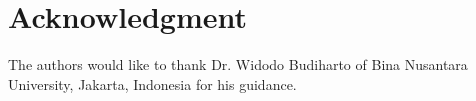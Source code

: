 \documentclass[conference]{IEEEtran}
\begin{document}


%


%
%
%



\section*{Acknowledgment}

The authors would like to thank Dr. Widodo Budiharto of Bina Nusantara University, Jakarta, Indonesia for his guidance.
\end{document}
